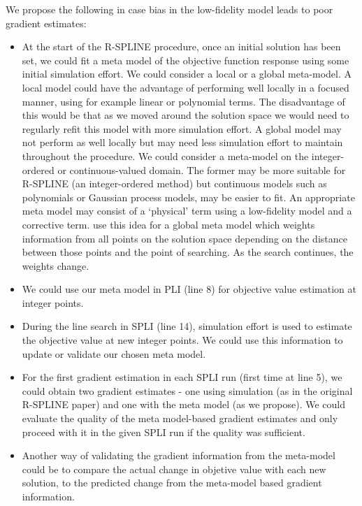 \documentclass[12pt,a4paper]{article}
\begin{document}
We propose the following in case bias in the low-fidelity model leads to poor gradient estimates:
%
\begin{itemize}[noitemsep]
\item At the start of the R-SPLINE procedure, once an initial solution has been set, we could fit a meta model of the objective function response using some initial simulation effort. We could consider a local or a global meta-model. A local model could have the advantage of performing well locally in a focused manner, using for example linear or polynomial terms. The disadvantage of this would be that as we moved around the solution space we would need to regularly refit this model with more simulation effort. A global model may not perform as well locally but may need less simulation effort to maintain throughout the procedure. We could consider a meta-model on the integer-ordered or continuous-valued domain. The former may be more suitable for R-SPLINE (an integer-ordered method) but continuous models such as polynomials or Gaussian process models, may be easier to fit. An appropriate meta model may consist of a `physical' term using a low-fidelity model and a corrective term. \cite{osorio2015computationally} use this idea for a global meta model which weights information from all points on the solution space depending on the distance between those points and the point of searching. As the search continues, the weights change. 
  \item We could use our meta model in PLI (line 8) for objective value estimation at integer points.
  \item During the line search in SPLI (line 14), simulation effort is used to estimate the objective value at new integer points. We could use this information to update or validate our chosen meta model. 
  \item For the first gradient estimation in each SPLI run (first time at line 5), we could obtain two gradient estimates - one using simulation (as in the original R-SPLINE paper) and one with the meta model (as we propose). We could evaluate the quality of the meta model-based gradient estimates and only proceed with it in the given SPLI run if the quality was sufficient.
  \item Another way of validating the gradient information from the meta-model could be to compare the actual change in objetive value with each new solution, to the predicted change from the meta-model based gradient information.
  \end{itemize}



\end{document}
